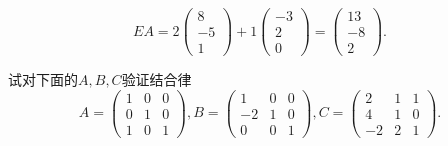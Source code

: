 ﻿\documentclass{book} \usepackage{exsheets} \usepackage{xeCJK}
\begin{document}
\begin{solution}
$$
EA=2
\begin{pmatrix}
  8\\
  -5\\
  1
\end{pmatrix}+1
\begin{pmatrix}
  -3\\
  2\\
  0
\end{pmatrix}=
\begin{pmatrix}
  13\\
  -8\\
  2
\end{pmatrix}.
$$
\end{solution}
\begin{question}
  试对下面的$A,B,C$验证结合律
$$
A=
\begin{pmatrix}
  1&0&0\\
  0&1&0\\
  1&0&1
\end{pmatrix},B=
\begin{pmatrix}
  1&0&0\\
  -2&1&0\\
  0&0&1
\end{pmatrix},C=
\begin{pmatrix}
  2&1&1\\
  4&1&0\\
  -2&2&1
\end{pmatrix}.
$$
\end{question}
\end{document}
